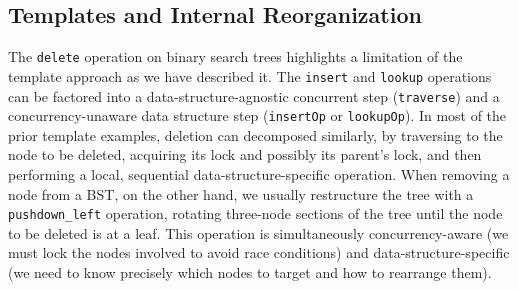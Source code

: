 \documentclass[sigplan,10pt,anonymous,review]{acmart}\settopmatter{printfolios=true,printccs=false,printacmref=false}
\newcommand{\treerep}{\ensuremath{\mathsf{Abs}}}
\begin{document}



\subsection{Templates and Internal Reorganization}
\label{internal_reorganize}
The \lstinline{delete} operation on binary search trees highlights a limitation of the template approach as we have described it. The \lstinline{insert} and \lstinline{lookup} operations can be factored into a data-structure-agnostic concurrent step (\lstinline{traverse}) and a concurrency-unaware data structure step (\lstinline{insertOp} or \lstinline{lookupOp}). In most of the prior template examples, deletion can decomposed similarly, by traversing to the node to be deleted, acquiring its lock and possibly its parent's lock, and then performing a local, sequential data-structure-specific operation. When removing a node from a BST, on the other hand, we usually restructure the tree with a \lstinline{pushdown_left} operation, %
rotating three-node sections of the tree until the node to be deleted is at a leaf. This operation is simultaneously concurrency-aware (we must lock the nodes involved to avoid race conditions) and data-structure-specific (we need to know precisely which nodes to target and how to rearrange them).
\end{document}
